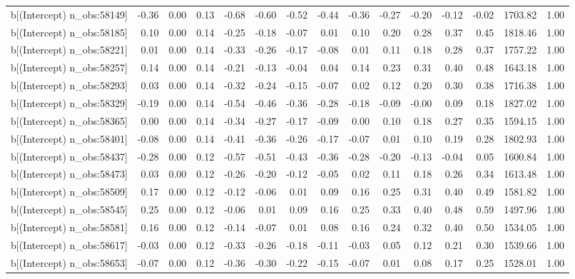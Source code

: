\begin{table}[ht]
\begin{tabular}{rrrrrrrrrrrrrrr}
  b[(Intercept) n\_obs:58149] & -0.36 & 0.00 & 0.13 & -0.68 & -0.60 & -0.52 & -0.44 & -0.36 & -0.27 & -0.20 & -0.12 & -0.02 & 1703.82 & 1.00 \\ 
  b[(Intercept) n\_obs:58185] & 0.10 & 0.00 & 0.14 & -0.25 & -0.18 & -0.07 & 0.01 & 0.10 & 0.20 & 0.28 & 0.37 & 0.45 & 1818.46 & 1.00 \\ 
  b[(Intercept) n\_obs:58221] & 0.01 & 0.00 & 0.14 & -0.33 & -0.26 & -0.17 & -0.08 & 0.01 & 0.11 & 0.18 & 0.28 & 0.37 & 1757.22 & 1.00 \\ 
  b[(Intercept) n\_obs:58257] & 0.14 & 0.00 & 0.14 & -0.21 & -0.13 & -0.04 & 0.04 & 0.14 & 0.23 & 0.31 & 0.40 & 0.48 & 1643.18 & 1.00 \\ 
  b[(Intercept) n\_obs:58293] & 0.03 & 0.00 & 0.14 & -0.32 & -0.24 & -0.15 & -0.07 & 0.02 & 0.12 & 0.20 & 0.30 & 0.38 & 1716.38 & 1.00 \\ 
  b[(Intercept) n\_obs:58329] & -0.19 & 0.00 & 0.14 & -0.54 & -0.46 & -0.36 & -0.28 & -0.18 & -0.09 & -0.00 & 0.09 & 0.18 & 1827.02 & 1.00 \\ 
  b[(Intercept) n\_obs:58365] & 0.00 & 0.00 & 0.14 & -0.34 & -0.27 & -0.17 & -0.09 & 0.00 & 0.10 & 0.18 & 0.27 & 0.35 & 1594.15 & 1.00 \\ 
  b[(Intercept) n\_obs:58401] & -0.08 & 0.00 & 0.14 & -0.41 & -0.36 & -0.26 & -0.17 & -0.07 & 0.01 & 0.10 & 0.19 & 0.28 & 1802.93 & 1.00 \\ 
  b[(Intercept) n\_obs:58437] & -0.28 & 0.00 & 0.12 & -0.57 & -0.51 & -0.43 & -0.36 & -0.28 & -0.20 & -0.13 & -0.04 & 0.05 & 1600.84 & 1.00 \\ 
  b[(Intercept) n\_obs:58473] & 0.03 & 0.00 & 0.12 & -0.26 & -0.20 & -0.12 & -0.05 & 0.02 & 0.11 & 0.18 & 0.26 & 0.34 & 1613.48 & 1.00 \\ 
  b[(Intercept) n\_obs:58509] & 0.17 & 0.00 & 0.12 & -0.12 & -0.06 & 0.01 & 0.09 & 0.16 & 0.25 & 0.31 & 0.40 & 0.49 & 1581.82 & 1.00 \\ 
  b[(Intercept) n\_obs:58545] & 0.25 & 0.00 & 0.12 & -0.06 & 0.01 & 0.09 & 0.16 & 0.25 & 0.33 & 0.40 & 0.48 & 0.59 & 1497.96 & 1.00 \\ 
  b[(Intercept) n\_obs:58581] & 0.16 & 0.00 & 0.12 & -0.14 & -0.07 & 0.01 & 0.08 & 0.16 & 0.24 & 0.32 & 0.40 & 0.50 & 1534.05 & 1.00 \\ 
  b[(Intercept) n\_obs:58617] & -0.03 & 0.00 & 0.12 & -0.33 & -0.26 & -0.18 & -0.11 & -0.03 & 0.05 & 0.12 & 0.21 & 0.30 & 1539.66 & 1.00 \\ 
  b[(Intercept) n\_obs:58653] & -0.07 & 0.00 & 0.12 & -0.36 & -0.30 & -0.22 & -0.15 & -0.07 & 0.01 & 0.08 & 0.17 & 0.25 & 1528.01 & 1.00 \\ 

\end{tabular}
\end{table}
